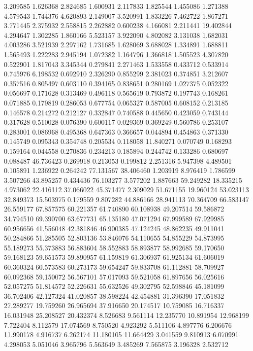 3.209585
1.626368
2.824685
1.600931
2.117833
1.825544
1.455086
1.271388
4.579543
1.744376
4.620893
2.149007
3.520991
1.833226
7.462722
1.867271
3.771445
2.375932
2.558815
2.262882
0.600238
4.166081
2.211441
19.402844
4.294647
1.302285
1.860166
5.523157
3.922090
4.802082
3.131038
1.682031
4.003286
3.521939
2.297162
1.731685
1.628069
3.688028
1.334891
1.688811
1.565493
1.222283
2.945194
1.072382
1.164796
1.366818
1.505523
4.307820
0.522901
1.817043
3.345344
0.279841
2.271463
1.533558
0.433712
0.533914
0.745976
6.198532
0.692910
2.326290
0.855299
2.381023
0.374851
3.212607
0.357516
0.805497
0.603110
0.394165
0.838651
0.280169
1.027375
0.052322
0.056697
0.171628
0.313469
0.496118
0.565619
0.793872
0.197743
0.168261
0.071885
0.179819
0.286053
0.677754
0.065327
0.587005
0.608152
0.213185
0.146578
0.214272
0.212127
0.332847
0.740588
0.445650
0.423059
0.743144
0.317628
0.510028
0.076390
0.600117
0.029369
0.369249
0.560786
0.253107
0.283001
0.086968
0.495368
0.647363
0.366657
0.044894
0.454863
0.371330
0.145749
0.095343
0.354748
0.205534
0.118058
11.840271
0.070749
0.168293
0.159164
0.044558
0.270836
0.234213
0.185894
0.244742
0.133286
0.680697
0.088487
46.736423
0.269918
0.213053
0.199812
2.251316
5.947398
4.489501
0.105891
1.236922
0.264242
77.131567
38.406460
1.203919
8.976419
1.786599
3.507266
43.895257
0.434436
76.103277
3.577202
1.887663
59.249282
18.335215
4.973062
22.416112
37.066022
45.371477
2.309029
51.671155
19.960124
53.023113
32.849373
15.503975
0.179559
9.807282
44.886166
28.941113
70.364709
66.583147
26.559177
67.857575
60.221357
61.740890
60.108938
49.207514
59.586872
34.794510
69.390700
63.677731
65.135180
47.071294
67.999589
67.929985
60.956656
41.556048
42.381846
46.900385
47.124245
48.862235
49.911041
50.284866
51.285505
52.803136
53.846076
54.110655
54.855229
54.873995
55.189273
55.373883
56.883604
58.552883
58.893877
58.992685
59.170650
59.168123
59.651573
59.890957
61.159819
61.306937
61.925134
61.606019
60.360324
60.573583
60.273173
59.654247
59.833708
61.112881
58.709927
60.092368
59.150072
56.567101
57.017093
59.521058
61.897656
56.025616
52.057275
51.814572
52.226631
55.632526
49.302795
52.598846
45.181099
36.702406
42.127324
41.020857
38.598224
42.454881
31.396390
17.051832
27.289277
19.759260
26.965694
37.916650
20.174517
10.759085
16.716337
16.031948
25.208527
20.432374
8.526683
9.561114
12.235770
10.891954
12.968199
7.722404
8.112579
17.074569
8.750520
4.923292
5.511106
4.897776
6.206676
11.990178
4.916737
6.262174
11.180105
11.664429
3.041559
9.810913
6.070991
4.298053
5.051046
3.965796
5.563649
3.485269
7.565875
3.196328
2.532712
